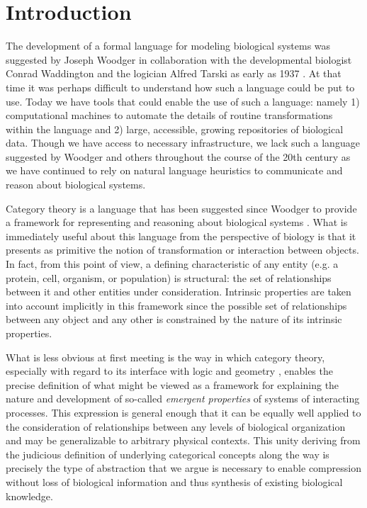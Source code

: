 \documentclass[aps,twocolumn]{revtex4}
\begin{document}
\section{Introduction}
The development of a formal language for modeling biological systems was suggested by Joseph Woodger in collaboration with the developmental biologist Conrad Waddington and the logician Alfred Tarski as early as 1937 \cite{Woodger1937,Woodger1951,Woodger1952,Woodger1952a}. At that time it was perhaps difficult to understand how such a language could be put to use. Today we have tools that could enable the use of such a language: namely 1) computational machines to automate the details of routine transformations within the language and 2) large, accessible, growing repositories of biological data. Though we have access to necessary infrastructure, we lack such a language suggested by Woodger and others throughout the course of the 20th century as we have continued to rely on natural language heuristics to communicate and reason about biological systems.

Category theory \cite{Lane1985,Lane1998,MacLane1992,Lawvere1997,Lawvere2003,Awodey2006} is a language that has been suggested since Woodger to provide a framework for representing and reasoning about biological systems \cite{GOGUEN1979,Ehresmann2007,Louie2009}. What is immediately useful about this language from the perspective of biology is that it presents as primitive the notion of transformation or interaction between objects. In fact, from this point of view, a defining characteristic of any entity (e.g. a protein, cell, organism, or population) is structural: the set of relationships between it and other entities under consideration. Intrinsic properties are taken into account implicitly in this framework since the possible set of relationships between any object and any other is constrained by the nature of its intrinsic properties. 

What is less obvious at first meeting is the way in which category theory, especially with regard to its interface with logic and geometry \cite{MacLane1992,Jacobs1998}, enables the precise definition of what might be viewed as a framework for explaining the nature and development of so-called \emph{emergent properties} of systems of interacting processes. This expression is general enough that it can be equally well applied to the consideration of relationships between any levels of biological organization and may be generalizable to arbitrary physical contexts. This unity deriving from the judicious definition of underlying categorical concepts along the way is precisely the type of abstraction that we argue is necessary to enable compression without loss of biological information and thus synthesis of existing biological knowledge.
\end{document}

